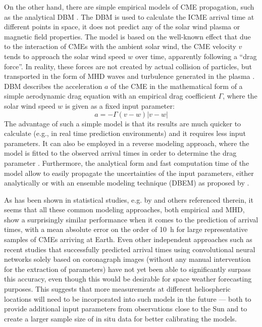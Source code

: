 On the other hand, there are simple empirical models of \ac{CME} propagation, such as the analytical \acl{DBM} \citep[\acs{DBM},][]{Vrsnak-2013}. The \ac{DBM} is used to calculate the \ac{ICME} arrival time at different points in space, it does not predict any of the solar wind plasma or magnetic field properties. The model is based on the well-known effect that due to the interaction of \acp{CME} with the ambient solar wind, the \ac{CME} velocity $v$ tends to approach the solar wind speed $w$ over time, apparently following a ``drag force''. In reality, these forces are not created by actual collision of particles, but transported in the form of \ac{MHD} waves and turbulence generated in the plasma \citep[see e.g.][for details]{Cargill-1996,Owens-2004}. \ac{DBM} describes the acceleration $a$ of the \ac{CME} in the mathematical form of a simple aerodynamic drag equation with an empirical drag coefficient $\Gamma$, where the solar wind speed $w$ is given as a fixed input parameter:
\begin{equation}
    a = -\Gamma (v-w) |v-w|
\end{equation}
The advantage of such a simple model is that its results are much quicker to calculate (e.g., in real time prediction environments) and it requires less input parameters. It can also be employed in a reverse modeling approach, where the model is fitted to the observed arrival times in order to determine the drag parameter \citep{Zic-2015}. Furthermore, the analytical form and fast computation time of the model allow to easily propagate the uncertainties of the input parameters, either analytically or with an ensemble modeling technique (DBEM) as proposed by \citet{Dumbovic-2018}.

As has been shown in statistical studies, e.g. by \citet{Vrsnak-2014,Dumbovic-2018} and others referenced therein, it seems that all these common modeling approaches, both empirical and \ac{MHD}, show a surprisingly similar performance when it comes to the prediction of arrival times, with a mean absolute error on the order of \SI{10}{\hour} for large representative samples of \acp{CME} arriving at Earth. Even other independent approaches such as recent studies that successfully predicted arrival times using convolutional neural networks solely based on coronagraph images (without any manual intervention for the extraction of parameters) \citep{Wang-2019} have not yet been able to significantly surpass this accuracy, even though this would be desirable for space weather forecasting purposes. This suggests that more measurements at different heliospheric locations will need to be incorporated into such models in the future --- both to provide additional input parameters from observations close to the Sun and to create a larger sample size of in situ data for better calibrating the models.

